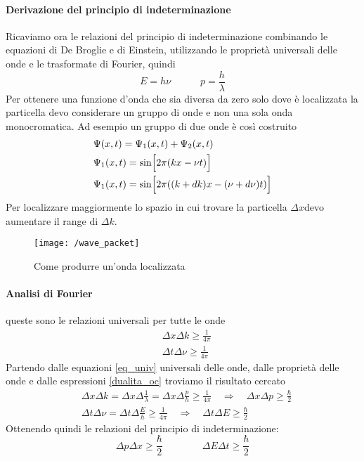 \paragraph{Derivazione del principio di indeterminazione}
Ricaviamo ora le relazioni del principio di indeterminazione combinando le equazioni di De Broglie e di Einstein, utilizzando le proprietà universali delle onde e le trasformate di Fourier, quindi
\begin{equation}
E = h \nu \quad\quad\quad p = \frac{ h}{\lambda }
\label{dualita_oc}
\end{equation}
Per ottenere una funzione d'onda che sia diversa da zero solo dove è localizzata la particella devo considerare un gruppo di onde e non una sola onda monocromatica.
Ad esempio un gruppo di due onde è così costruito
\begin{equation}
\begin{split}
& \Psi(x,t) = \Psi_1(x,t) + \Psi_2(x,t) \\
& \Psi_1(x,t) = \sin \Bigl[  2\pi (kx -\nu t)  \Bigr] \\
& \Psi_1(x,t) = \sin \Bigl[  2\pi ((k + dk) x - (\nu +d\nu) t)  \Bigr]
\end{split}
\label{eq_onde_gen}
\end{equation}
Per localizzare maggiormente lo spazio in cui trovare la particella $\Delta x$devo aumentare il range di $\Delta k$.
\begin{figure}[h]
\centering
\texttt{[image: /wave\_packet]}
\caption{Come produrre un'onda localizzata}
\end{figure}

\paragraph{Analisi di Fourier} 
queste sono le relazioni universali per tutte le onde
\begin{equation}
\begin{split}
& \Delta x \Delta k \ge \frac{ 1}{4\pi } \\
& \Delta t \Delta \nu \ge \frac{ 1}{4\pi }
\end{split}
\label{eq_univ}
\end{equation}
Partendo dalle equazioni \ref{eq_univ} universali delle onde, dalle proprietà delle onde e dalle espressioni \ref{dualita_oc} troviamo il risultato cercato
\begin{equation}
\begin{split}
& \Delta x \Delta k = \Delta x \Delta \frac{1}{\lambda} = \Delta x \Delta \frac{p}{h}  \ge \frac{1}{4\pi} 
\quad\Rightarrow\quad \Delta x \Delta p \ge \frac{\hbar}{2} \\
& \Delta t \Delta \nu = \Delta t \Delta \frac{E}{h} \ge \frac{1}{4\pi} 
\quad\Rightarrow\quad  \Delta t \Delta E \ge \frac{\hbar}{2}
\end{split}
\end{equation}
Ottenendo quindi le relazioni del principio di indeterminazione:
\begin{equation}
\Delta p \Delta x \ge \frac{\hbar}{2} 
\quad\quad\quad\quad
\Delta E \Delta t \ge \frac{\hbar}{2}
\end{equation}

